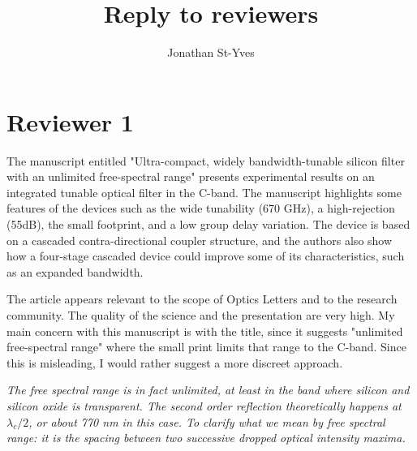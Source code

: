 \documentclass[]{article}
\title{Reply to reviewers}
\author{Jonathan St-Yves}
\begin{document}
\maketitle


\section*{Reviewer 1}
The manuscript entitled "Ultra-compact, widely bandwidth-tunable silicon filter with an unlimited free-spectral range" presents experimental results on an integrated tunable optical filter in the C-band. The manuscript highlights some features of the devices such as the wide tunability (670 GHz), a high-rejection (55dB), the small footprint, and a low group delay variation.
The device is based on a cascaded contra-directional coupler structure, and the authors also show how a four-stage cascaded device could improve some of its characteristics, such as an expanded bandwidth.

The article appears relevant to the scope of Optics Letters and to the research community. The quality of the science and the presentation are very high.
My main concern with this manuscript is with the title, since it suggests "unlimited free-spectral range" where the small print limits that range to the C-band. Since this is misleading, I would rather suggest a more discreet approach.

\emph{The free spectral range is in fact unlimited, at least in the band where silicon and silicon oxide is transparent. The second order reflection theoretically happens at $\lambda_c/2$, or about 770 nm in this case. 
To clarify what we mean by free spectral range: it is the spacing between two successive dropped optical intensity maxima.}
\end{document}
